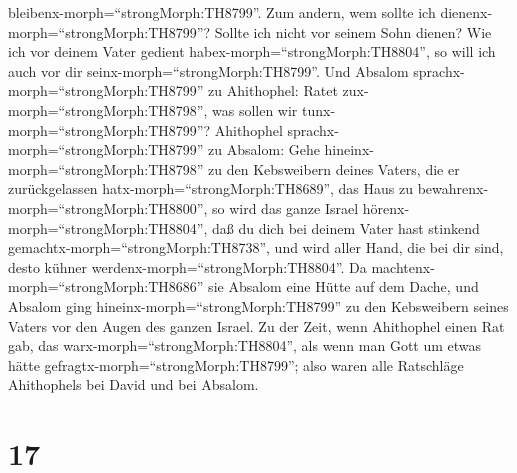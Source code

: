 bleibenx-morph=``strongMorph:TH8799''.  Zum andern, wem
sollte ich dienenx-morph=``strongMorph:TH8799''? Sollte ich nicht vor
seinem Sohn dienen? Wie ich vor deinem Vater gedient
habex-morph=``strongMorph:TH8804'', so will ich auch vor dir
seinx-morph=``strongMorph:TH8799''.  Und Absalom
sprachx-morph=``strongMorph:TH8799'' zu Ahithophel: Ratet
zux-morph=``strongMorph:TH8798'', was sollen wir
tunx-morph=``strongMorph:TH8799''?  Ahithophel
sprachx-morph=``strongMorph:TH8799'' zu Absalom: Gehe
hineinx-morph=``strongMorph:TH8798'' zu den Kebsweibern deines Vaters,
die er zurückgelassen hatx-morph=``strongMorph:TH8689'', das Haus zu
bewahrenx-morph=``strongMorph:TH8800'', so wird das ganze Israel
hörenx-morph=``strongMorph:TH8804'', daß du dich bei deinem Vater hast
stinkend gemachtx-morph=``strongMorph:TH8738'', und wird aller Hand, die
bei dir sind, desto kühner werdenx-morph=``strongMorph:TH8804''.
 Da machtenx-morph=``strongMorph:TH8686'' sie Absalom eine
Hütte auf dem Dache, und Absalom ging
hineinx-morph=``strongMorph:TH8799'' zu den Kebsweibern seines Vaters
vor den Augen des ganzen Israel.  Zu der Zeit, wenn
Ahithophel einen Rat gab, das warx-morph=``strongMorph:TH8804'', als
wenn man Gott um etwas hätte gefragtx-morph=``strongMorph:TH8799''; also
waren alle Ratschläge Ahithophels bei David und bei Absalom.

\hypertarget{section-16}{%
\section{17}\label{section-16}}

